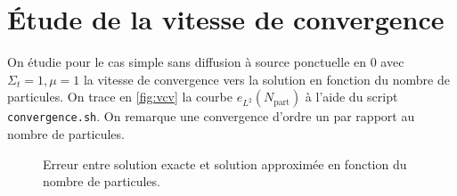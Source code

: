 \documentclass[11pt,a4paper]{article}
\begin{document}
\section{Étude de la vitesse de convergence}

On étudie pour le cas simple sans diffusion à source ponctuelle en $0$ avec $\Sigma_t=1, \mu=1$ la vitesse de convergence vers la solution en fonction du nombre de particules. On trace en \autoref{fig:vcv} la courbe $e_{L^2}(N_{\text{part}})$ à l'aide du script \texttt{convergence.sh}. On remarque une convergence d'ordre un par rapport au nombre de particules.   

\begin{figure}
  \centering
  \caption{Erreur entre solution exacte et solution approximée en fonction du nombre de particules.}
  \label{fig:vcv}
\end{figure}
\end{document}
